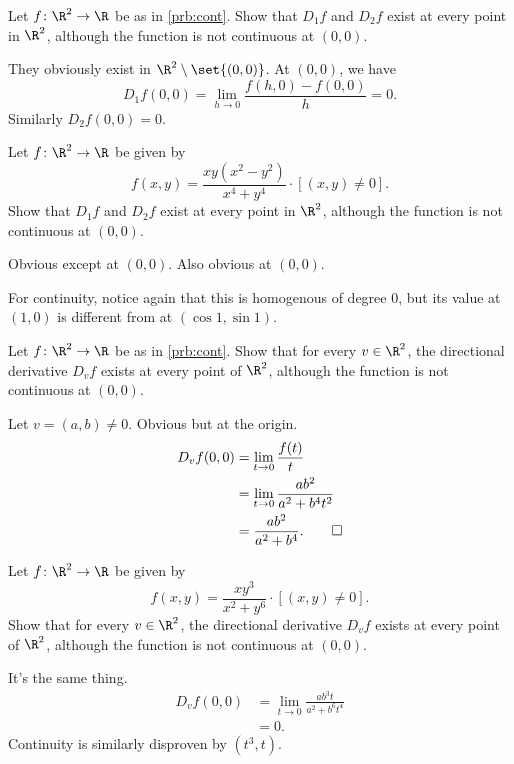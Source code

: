 \documentclass[12pt]{article}
\begin{document}
\begin{problem}
    Let $f\colon \R^2 \to \R$ be as in
    \cref{prb:cont}.
    Show that $D_1 f$ and $D_2 f$ exist at every point in $\R^2$,
    although the function is not continuous at $(0, 0)$.
\end{problem}
\begin{solution}
    They obviously exist in $\R^2 \setminus \set{(0, 0)}$.
    At $(0, 0)$, we have \[
        D_1 f(0, 0) = \lim_{h \to 0} \frac{f(h, 0) - f(0, 0)}{h} = 0.
    \] Similarly $D_2 f(0, 0) = 0$.
\end{solution}

\begin{problem}
    Let $f\colon \R^2 \to \R$ be given by \[
        f(x, y) = \frac{xy(x^2 - y^2)}{x^4 + y^4} \cdot [(x, y) \ne 0].
    \]
    Show that $D_1 f$ and $D_2 f$ exist at every point in $\R^2$,
    although the function is not continuous at $(0, 0)$.
\end{problem}
\begin{solution}
    Obvious except at $(0, 0)$.
    Also obvious at $(0, 0)$.

    For continuity, notice again that this is homogenous of degree 0,
    but its value at $(1, 0)$ is different from at
    $(\cos 1, \sin 1)$.
\end{solution}

\begin{problem}
    Let $f\colon \R^2 \to \R$ be as in
    \cref{prb:cont}.
    Show that for every $v \in \R^2$, the directional derivative
    $D_vf$ exists at every point of $\R^2$, although the function is not
    continuous at $(0, 0)$.
\end{problem}
\begin{solution}
    Let $v = (a, b) \ne 0$.
    Obvious but at the origin.
    \begin{align*}
        D_vf(0, 0) &= \lim_{t \to 0} \frac{f(t)}{t} \\
        &= \lim_{t \to 0} \frac{ab^2}{a^2 + b^4 t^2} \\
        &= \frac{ab^2}{a^2 + b^4}. \qedhere
    \end{align*}
\end{solution}

\begin{problem}
    Let $f\colon \R^2 \to \R$ be given by \[
        f(x, y) = \frac{xy^3}{x^2 + y^6} \cdot [(x, y) \ne 0].
    \]
    Show that for every $v \in \R^2$, the directional derivative
    $D_vf$ exists at every point of $\R^2$, although the function is not
    continuous at $(0, 0)$.
\end{problem}
\begin{solution}
    It's the same thing.
    \begin{align*}
        D_vf(0, 0) &= \lim_{t \to 0} \frac{ab^3 t}{a^2 + b^6 t^4} \\
        &= 0.
    \end{align*}
    Continuity is similarly disproven by $(t^3, t)$.
\end{solution}
\end{document}
